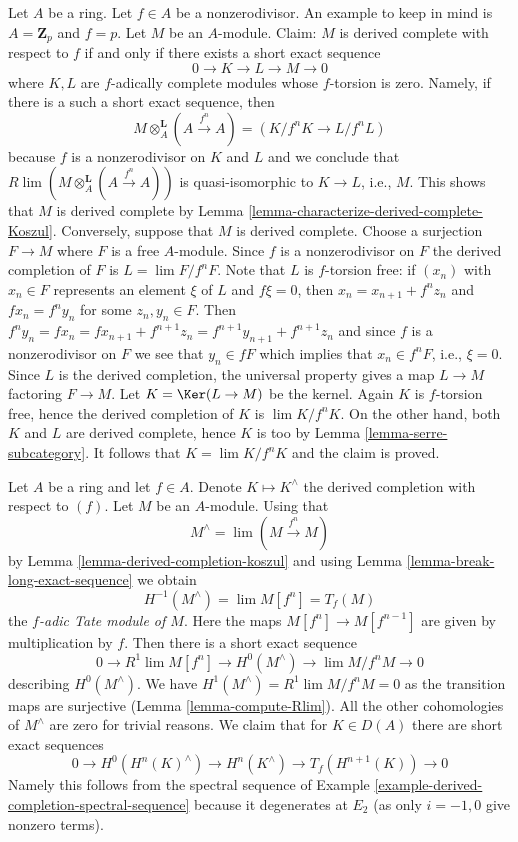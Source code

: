 \begin{example}
\label{example-derived-complete-modules}
Let $A$ be a ring. Let $f \in A$ be a nonzerodivisor. An example
to keep in mind is $A = \mathbf{Z}_p$ and $f = p$. Let $M$ be
an $A$-module. Claim: $M$ is derived complete with respect to $f$
if and only if there exists a short exact sequence
$$
0 \to K \to L \to M \to 0
$$
where $K, L$ are $f$-adically complete modules whose $f$-torsion is zero.
Namely, if there is a such a short exact sequence, then
$$
M \otimes_A^\mathbf{L} (A \xrightarrow{f^n} A) = (K/f^nK \to L/f^nL)
$$
because $f$ is a nonzerodivisor on $K$ and $L$
and we conclude that $R\lim (M \otimes_A^\mathbf{L} (A \xrightarrow{f^n} A))$
is quasi-isomorphic to $K \to L$, i.e., $M$. This shows that $M$ is
derived complete by Lemma \ref{lemma-characterize-derived-complete-Koszul}.
Conversely, suppose that $M$ is derived complete. Choose a surjection
$F \to M$ where $F$ is a free $A$-module. Since $f$ is a nonzerodivisor
on $F$ the derived completion of $F$ is $L = \lim F/f^nF$.
Note that $L$ is $f$-torsion free: if $(x_n)$ with $x_n \in F$ represents
an element $\xi$ of $L$ and $f\xi = 0$, then $x_n = x_{n + 1} + f^nz_n$
and $fx_n = f^ny_n$ for some $z_n, y_n \in F$. Then $f^n y_n = fx_n =
fx_{n + 1} + f^{n + 1}z_n = f^{n + 1}y_{n + 1} + f^{n + 1}z_n$ and since
$f$ is a nonzerodivisor on $F$ we see that $y_n \in fF$ which implies
that $x_n \in f^nF$, i.e., $\xi = 0$. Since $L$ is the derived
completion, the universal property gives a map $L \to M$ factoring
$F \to M$. Let $K = \Ker(L \to M)$ be the kernel.
Again $K$ is $f$-torsion free, hence the derived completion of
$K$ is $\lim K/f^nK$. On the other hand, both $K$ and $L$ are derived
complete, hence $K$ is too by Lemma \ref{lemma-serre-subcategory}.
It follows that $K = \lim K/f^nK$ and the claim is proved.
\end{example}

\begin{example}
\label{example-spectral-sequence-principal}
Let $A$ be a ring and let $f \in A$. Denote $K \mapsto K^\wedge$ the
derived completion with respect to $(f)$. Let $M$ be an $A$-module.
Using that
$$
M^\wedge = \lim (M \xrightarrow{f^n} M)
$$
by Lemma \ref{lemma-derived-completion-koszul}
and using Lemma \ref{lemma-break-long-exact-sequence} we obtain
$$
H^{-1}(M^\wedge) = \lim M[f^n] = T_f(M)
$$
the {\it $f$-adic Tate module of $M$}. Here the maps $M[f^n] \to M[f^{n - 1}]$
are given by multiplication by $f$. Then there is a short exact sequence
$$
0 \to R^1\lim M[f^n] \to H^0(M^\wedge) \to \lim M/f^n M \to 0
$$
describing $H^0(M^\wedge)$. We have $H^1(M^\wedge) = R^1\lim M/f^nM = 0$
as the transition maps are surjective (Lemma \ref{lemma-compute-Rlim}).
All the other cohomologies of $M^\wedge$ are zero for trivial reasons.
We claim that for $K \in D(A)$ there are short exact sequences
$$
0 \to H^0(H^n(K)^\wedge) \to H^n(K^\wedge) \to T_f(H^{n + 1}(K)) \to 0
$$
Namely this follows from the spectral
sequence of Example \ref{example-derived-completion-spectral-sequence}
because it degenerates at $E_2$ (as only $i = -1, 0$ give nonzero terms).
\end{example}




